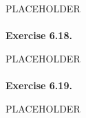 \documentclass{article}
\begin{document}
PLACEHOLDER \\\\






\textbf{Exercise 6.18.}

PLACEHOLDER \\\\






\textbf{Exercise 6.19.}

PLACEHOLDER \\\\



\end{document}
